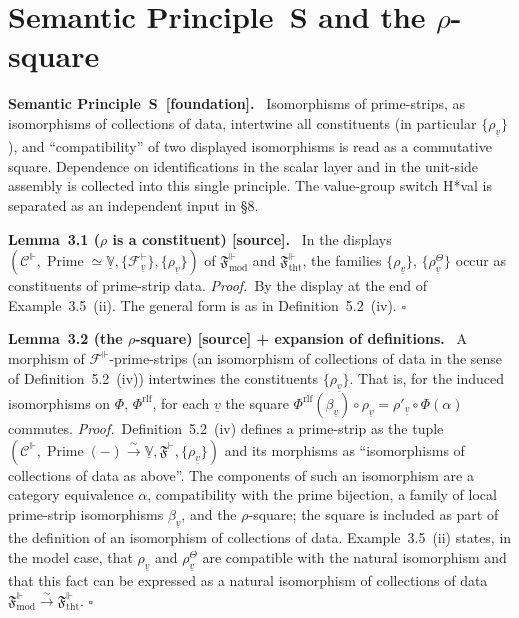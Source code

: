 \documentclass[11pt]{article}
\newcommand{\stmt}[2]{\medskip\noindent\textbf{#1\ #2.}\ }
\newcommand{\pf}{\medskip\noindent\textit{Proof.}\ }
\newcommand{\qedh}{\hfill\(\square\)\par\medskip}
\begin{document}
\section{Semantic Principle~S and the $\rho$-square}

\stmt{Semantic Principle~S}{[foundation]}
Isomorphisms of prime-strips, as isomorphisms of collections of
data, intertwine all constituents (in particular
$\{\rho_{\underline v}\}$), and ``compatibility'' of two displayed
isomorphisms is read as a commutative square.  Dependence on
identifications in the scalar layer and in the unit-side assembly is
collected into this single principle.  The value-group switch
H*val is separated as an independent input in \S8.

\stmt{Lemma}{3.1 ($\rho$ is a constituent) [source]}
In the displays
$(\mathcal C^{\Vdash},\operatorname{Prime}\simeq\underline{\mathbb
V},\{\mathcal F^{\vdash}_{\underline
v}\},\{\rho_{\underline v}\})$ of
$\mathfrak F^{\Vdash}_{\mathrm{mod}}$ and
$\mathfrak F^{\Vdash}_{\mathrm{tht}}$, the families
$\{\rho_{\underline v}\}$, $\{\rho^{\Theta}_{\underline v}\}$ occur
as constituents of prime-strip data.
\pf By the display at the end of Example~3.5~(ii).  The general
form is as in Definition~5.2~(iv). \qedh

\stmt{Lemma}{3.2 (the $\rho$-square) [source] + expansion of definitions}
A morphism of $\mathcal F^{\Vdash}$-prime-strips (an isomorphism of
collections of data in the sense of Definition~5.2~(iv)) intertwines
the constituents $\{\rho_{\underline v}\}$.  That is, for the
induced isomorphisms on $\Phi$, $\Phi^{\mathrm{rlf}}$, for each
$\underline v$ the square
$\Phi^{\mathrm{rlf}}(\beta_{\underline v})\circ\rho_{\underline v}
=\rho'_{\underline v}\circ\Phi(\alpha)$ commutes.
\pf Definition~5.2~(iv) defines a prime-strip as the tuple
$(\mathcal C^{\Vdash},
\operatorname{Prime}(-)\xrightarrow{\sim}\underline{\mathbb V},
\mathfrak F^{\vdash},\{\rho_{\underline v}\})$ and its morphisms as
``isomorphisms of collections of data as above''.  The components
of such an isomorphism are a category equivalence $\alpha$,
compatibility with the prime bijection, a family of local
prime-strip isomorphisms $\beta_{\underline v}$, and the
$\rho$-square; the square is included as part of the definition of
an isomorphism of collections of data.  Example~3.5~(ii) states, in
the model case, that $\rho_{\underline v}$ and
$\rho^{\Theta}_{\underline v}$ are compatible with the natural
isomorphism and that this fact can be expressed as a natural
isomorphism of collections of data
$\mathfrak F^{\Vdash}_{\mathrm{mod}}\xrightarrow{\sim}
\mathfrak F^{\Vdash}_{\mathrm{tht}}$. \qedh
\end{document}
